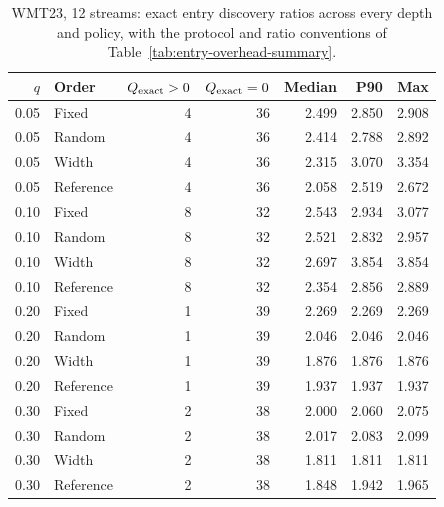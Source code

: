 \begin{table}[t]
\centering\small


\begin{tabular}{rlrrrrr}
\toprule
$q$ & Order & $Q_{\rm exact}>0$ & $Q_{\rm exact}=0$ & Median & P90 & Max \\
\midrule
0.05 & Fixed & 4 & 36 & 2.499 & 2.850 & 2.908 \\
0.05 & Random & 4 & 36 & 2.414 & 2.788 & 2.892 \\
0.05 & Width & 4 & 36 & 2.315 & 3.070 & 3.354 \\
0.05 & Reference & 4 & 36 & 2.058 & 2.519 & 2.672 \\
0.10 & Fixed & 8 & 32 & 2.543 & 2.934 & 3.077 \\
0.10 & Random & 8 & 32 & 2.521 & 2.832 & 2.957 \\
0.10 & Width & 8 & 32 & 2.697 & 3.854 & 3.854 \\
0.10 & Reference & 8 & 32 & 2.354 & 2.856 & 2.889 \\
0.20 & Fixed & 1 & 39 & 2.269 & 2.269 & 2.269 \\
0.20 & Random & 1 & 39 & 2.046 & 2.046 & 2.046 \\
0.20 & Width & 1 & 39 & 1.876 & 1.876 & 1.876 \\
0.20 & Reference & 1 & 39 & 1.937 & 1.937 & 1.937 \\
0.30 & Fixed & 2 & 38 & 2.000 & 2.060 & 2.075 \\
0.30 & Random & 2 & 38 & 2.017 & 2.083 & 2.099 \\
0.30 & Width & 2 & 38 & 1.811 & 1.811 & 1.811 \\
0.30 & Reference & 2 & 38 & 1.848 & 1.942 & 1.965 \\
\bottomrule
\end{tabular}
\caption{WMT23, 12 streams: exact entry discovery ratios across every depth and policy, with the protocol and ratio conventions of Table~\ref{tab:entry-overhead-summary}.}
\label{tab:entry-overhead-all-2}
\end{table}
